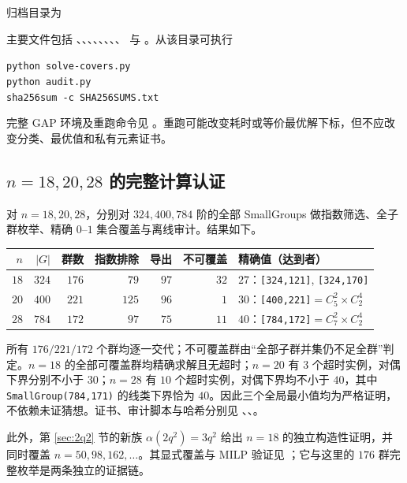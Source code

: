 \documentclass[11pt,a4paper]{article}
\numberwithin{equation}{section}
\theoremstyle{plain}
\theoremstyle{definition}
\theoremstyle{remark}
\begin{document}
归档目录为
\begin{center}
\end{center}
主要文件包括 、、、、、、、、 与 。从该目录可执行
\begin{center}
\texttt{python solve-covers.py}\\
\texttt{python audit.py}\\
\texttt{sha256sum -c SHA256SUMS.txt}
\end{center}
完整 GAP 环境及重跑命令见 。重跑可能改变耗时或等价最优解下标，但不应改变分类、最优值和私有元素证书。

\subsection{\texorpdfstring{$n=18,20,28$}{n=18,20,28} 的完整计算认证}
对 $n=18,20,28$，分别对 $324,400,784$ 阶的全部 SmallGroups 做指数筛选、全子群枚举、精确 $0$--$1$ 集合覆盖与离线审计。结果如下。
\begin{center}
\small
\begin{tabular}{rrrrrrl}
\toprule
$n$ & $|G|$ & 群数 & 指数排除 & 导出 & 不可覆盖 & 精确值（达到者）\\
\midrule
$18$ & $324$ & $176$ & $79$ & $97$ & $32$ & $27$：\texttt{[324,121]}, \texttt{[324,170]}\\
$20$ & $400$ & $221$ & $125$ & $96$ & $1$ & $30$：\texttt{[400,221]}$=C_5^2\times C_2^4$\\
$28$ & $784$ & $172$ & $97$ & $75$ & $11$ & $40$：\texttt{[784,172]}$=C_7^2\times C_2^4$\\
\bottomrule
\end{tabular}
\end{center}
所有 $176/221/172$ 个群均逐一交代；不可覆盖群由“全部子群并集仍不足全群”判定。$n=18$ 的全部可覆盖群均精确求解且无超时；$n=20$ 有 $3$ 个超时实例，对偶下界分别不小于 $30$；$n=28$ 有 $10$ 个超时实例，对偶下界均不小于 $40$，其中 \texttt{SmallGroup(784,171)} 的线类下界恰为 $40$。因此三个全局最小值均为严格证明，不依赖未证猜想。证书、审计脚本与哈希分别见
、、。

此外，第 \ref{sec:2q2} 节的新族 $\alpha(2q^2)=3q^2$ 给出 $n=18$ 的独立构造性证明，并同时覆盖 $n=50,98,162,\ldots$。其显式覆盖与 MILP 验证见 ；它与这里的 $176$ 群完整枚举是两条独立的证据链。
\end{document}

